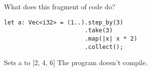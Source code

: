 %
%
What does this fragment of code do?

\begin{lstlisting}
let a: Vec<i32> = (1..).step_by(3)
                       .take(3)
                       .map(|x| x * 2)
                       .collect();
\end{lstlisting}

  \choice Sets a to {[2, 4, 6]}
  \choice The program doesn't compile.
  \choice {[4, 10, 16]}
  \choice {[2. 8, 14]}
